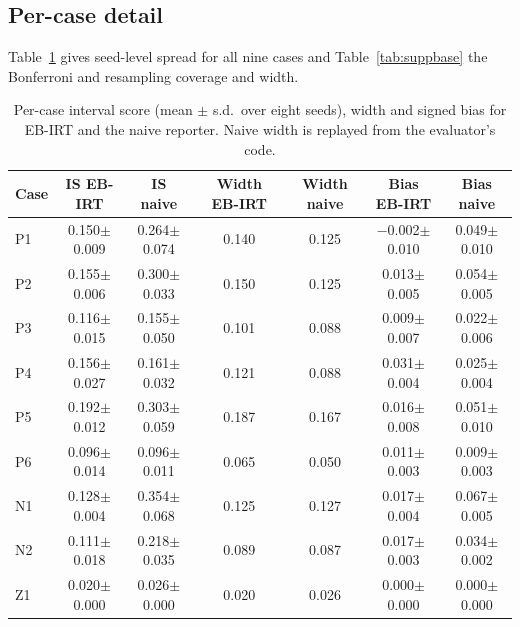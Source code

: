 \documentclass{article}
\begin{document}
\subsection{Per-case detail}
Table~\ref{tab:suppcase} gives seed-level spread for all nine cases and Table~\ref{tab:suppbase} the Bonferroni and resampling coverage and width.
\begin{table}[h]
\centering
\caption{Per-case interval score (mean $\pm$ s.d.\ over eight seeds), width and signed bias for EB-IRT and the naive reporter. Naive width is replayed from the evaluator's code.}
\label{tab:suppcase}
\footnotesize
\setlength{\tabcolsep}{4pt}
\begin{tabular}{lcccccc}
\toprule
Case & IS EB-IRT & IS naive & Width EB-IRT & Width naive & Bias EB-IRT & Bias naive \\
\midrule
P1 & 0.150$\pm$0.009 & 0.264$\pm$0.074 & 0.140 & 0.125 & $-$0.002$\pm$0.010 & 0.049$\pm$0.010 \\
P2 & 0.155$\pm$0.006 & 0.300$\pm$0.033 & 0.150 & 0.125 & 0.013$\pm$0.005 & 0.054$\pm$0.005 \\
P3 & 0.116$\pm$0.015 & 0.155$\pm$0.050 & 0.101 & 0.088 & 0.009$\pm$0.007 & 0.022$\pm$0.006 \\
P4 & 0.156$\pm$0.027 & 0.161$\pm$0.032 & 0.121 & 0.088 & 0.031$\pm$0.004 & 0.025$\pm$0.004 \\
P5 & 0.192$\pm$0.012 & 0.303$\pm$0.059 & 0.187 & 0.167 & 0.016$\pm$0.008 & 0.051$\pm$0.010 \\
P6 & 0.096$\pm$0.014 & 0.096$\pm$0.011 & 0.065 & 0.050 & 0.011$\pm$0.003 & 0.009$\pm$0.003 \\
N1 & 0.128$\pm$0.004 & 0.354$\pm$0.068 & 0.125 & 0.127 & 0.017$\pm$0.004 & 0.067$\pm$0.005 \\
N2 & 0.111$\pm$0.018 & 0.218$\pm$0.035 & 0.089 & 0.087 & 0.017$\pm$0.003 & 0.034$\pm$0.002 \\
Z1 & 0.020$\pm$0.000 & 0.026$\pm$0.000 & 0.020 & 0.026 & 0.000$\pm$0.000 & 0.000$\pm$0.000 \\
\bottomrule
\end{tabular}
\end{table}
\end{document}
